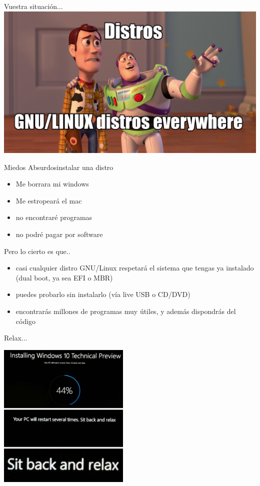 \documentclass{beamer}
\begin{document}
\begin{frame}{Vuestra situación...}
\includegraphics[width=\textwidth]{distroseverywhere.jpg}
\end {frame}

\begin{frame}{Miedos Absurdos}{instalar una distro}
\begin{itemize}
	\item Me borrara mi windows 
	\item Me estropeará el mac 
	\item no encontraré programas
	\item no podré pagar por software
\end{itemize}
\end{frame}

\begin{frame}{Pero lo cierto es que..}{}
\begin{itemize}
\item casi cualquier distro GNU/Linux respetará el sistema que tengas ya instalado (dual boot, ya sea EFI o MBR)
\item puedes probarlo sin instalarlo (vía live USB o CD/DVD)
\item encontrarás millones de programas muy útiles, y además dispondrás del código
\end{itemize}
\end{frame}
\begin{frame}{Relax...}
\begin{center}
\includegraphics[height=7cm,keepaspectratio]{relax.jpg}
\end{center}
\end {frame}
\end{document}
